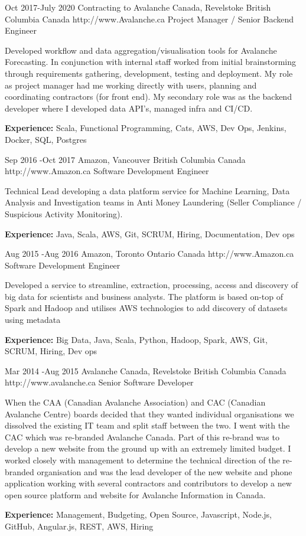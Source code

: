 \documentclass{article}
\begin{document}
\begin{job}
{Oct 2017-}{July 2020}
{Contracting to Avalanche Canada, Revelstoke British Columbia Canada}
{http://www.Avalanche.ca}
{Project Manager / Senior Backend Engineer}%
{Developed workflow and data aggregation/visualisation tools for Avalanche Forecasting. In conjunction with internal staff worked from initial brainstorming through requirements gathering, development, testing and deployment. My role as  project manager had me working directly with users, planning and coordinating contractors (for front end). My secondary role was as the backend developer where I developed data API's, managed infra and CI/CD.\\
\rule{0mm}{5mm}\textbf{Experience:} Scala, Functional Programming, Cats, AWS, Dev Ops, Jenkins, Docker, SQL, Postgres}
\end{job}

\begin{job}
{Sep 2016 -}{Oct 2017}
{Amazon, Vancouver British Columbia Canada}
{http://www.Amazon.ca}
{Software Development Engineer}%
{Technical Lead developing a data platform service for Machine Learning, Data Analysis and Investigation teams in Anti Money Laundering (Seller Compliance / Suspicious Activity Monitoring). \\
\rule{0mm}{5mm}\textbf{Experience:} Java, Scala, AWS, Git, SCRUM, Hiring, Documentation, Dev ops}
\end{job}


\begin{job}
{Aug 2015 -}{Aug 2016}
{Amazon, Toronto Ontario Canada}
{http://www.Amazon.ca}
{Software Development Engineer}%
{Developed a service to streamline, extraction, processing, access and discovery of big data for scientists and business analysts. The platform is based on-top of Spark and Hadoop and utilises AWS technologies to add discovery of datasets using metadata \\
\rule{0mm}{5mm}\textbf{Experience:} Big Data, Java, Scala, Python, Hadoop, Spark, AWS, Git, SCRUM, Hiring, Dev ops}
\end{job}

\begin{job}
{Mar 2014 -}{Aug 2015}
{Avalanche Canada, Revelstoke British Columbia Canada}
{http://www.avalanche.ca}
{Senior Software Developer}%
{When the CAA (Canadian Avalanche Association) and CAC (Canadian Avalanche Centre) boards decided that they wanted individual organisations we dissolved the existing IT team and split staff between the two. I went with the CAC which was re-branded Avalanche Canada. Part of this re-brand was to develop a new website from the ground up with an extremely limited budget. I worked closely with management to determine the technical direction of the re-branded organisation and was the lead developer of the new website and phone application working with several contractors and contributors to develop a new open source platform and website for Avalanche Information in Canada. \\
\rule{0mm}{5mm}\textbf{Experience:} Management, Budgeting, Open Source, Javascript, Node.js, GitHub, Angular.js, REST, AWS, Hiring }
\end{job}
\end{document}
